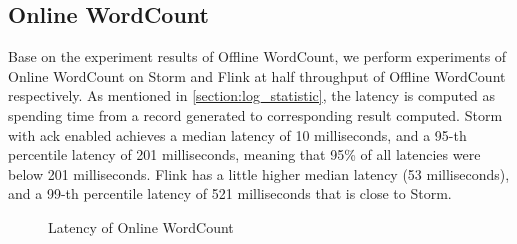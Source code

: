 \subsection{Online WordCount}
\label{subsec:online_wordcount}

Base on the experiment results of Offline WordCount, we perform experiments of Online WordCount on Storm and Flink at half throughput of Offline WordCount respectively.  As mentioned in \cref{section:log_statistic}, the latency is computed as spending time from a record generated to corresponding result computed. Storm with ack enabled achieves a median latency of 10 milliseconds, and a 95-th percentile latency of 201 milliseconds, meaning that 95\% of all latencies were below 201 milliseconds. Flink has a little higher median latency (53 milliseconds), and a 99-th percentile latency of 521 milliseconds that is close to Storm. 

\begin{figure}
  \begin{center}
   \caption{Latency of Online WordCount}
   \label{fig:online_wordcount_latency}
  \end{center}
\end{figure}

